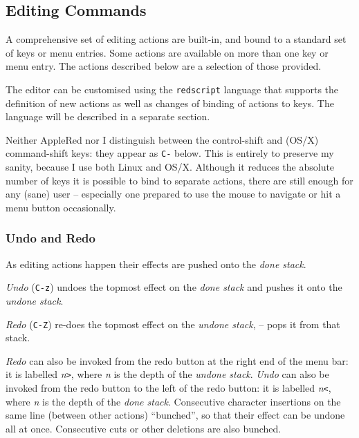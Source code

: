 \documentclass[12pt,a4paper]{article}
\begin{document}
\hypertarget{editing-commands}{%
\subsection{Editing Commands}\label{editing-commands}}

A comprehensive set of editing actions are built-in, and bound to a
standard set of keys or menu entries. Some actions are available on more
than one key or menu entry. The actions described below are a selection
of those provided.

The editor can be customised using the \texttt{redscript} language that
supports the definition of new actions as well as changes of binding of
actions to keys. The language will be described in a separate section.

Neither AppleRed nor I distinguish between the control-shift and (OS/X)
command-shift keys: they appear as \texttt{C-} below. This is entirely
to preserve my sanity, because I use both Linux and OS/X. Although it
reduces the absolute number of keys it is possible to bind to separate
actions, there are still enough for any (sane) user -- especially one
prepared to use the mouse to navigate or hit a menu button occasionally.

\hypertarget{undo-and-redo}{%
\subsubsection{Undo and Redo}\label{undo-and-redo}}

As editing actions happen their effects are pushed onto the \emph{done
stack}.

\emph{Undo} (\texttt{C-z}) undoes the topmost effect on the \emph{done
stack} and pushes it onto the \emph{undone stack}.

\emph{Redo} (\texttt{C-Z}) re-does the topmost effect on the
\emph{undone stack}, -- pops it from that stack.

\emph{Redo} can also be invoked from the redo button at the right end of
the menu bar: it is labelled \emph{n}\texttt{\textgreater{}}, where
\emph{n} is the depth of the \emph{undone stack}. \emph{Undo} can also
be invoked from the redo button to the left of the redo button: it is
labelled \emph{n}\texttt{\textless{}}, where \emph{n} is the depth of
the \emph{done stack}. Consecutive character insertions on the same line
(between other actions) ``bunched'', so that their effect can be undone
all at once. Consecutive cuts or other deletions are also bunched.
\end{document}
